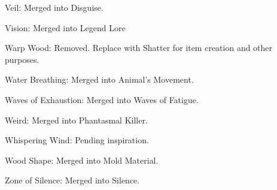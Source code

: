 {\begin{list}{}{\leftmargin=1em}
 \item Veil: Merged into Disguise.
 \item Vision: Merged into Legend Lore
 \item Warp Wood: Removed. Replace with Shatter for item creation and other purposes.
 \item Water Breathing: Merged into Animal's Movement.
 \item Waves of Exhaustion: Merged into Waves of Fatigue.
 \item Weird: Merged into Phantasmal Killer.
 \item Whispering Wind: Pending inspiration.
 \item Wood Shape: Merged into Mold Material.
 \item Zone of Silence: Merged into Silence.
\end{list}}
